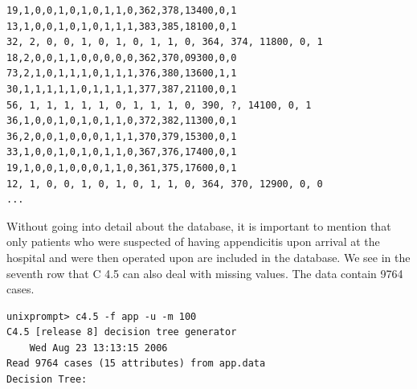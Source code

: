 \documentclass[10pt]{article}
\begin{document}
\begin{verbatim}
19,1,0,0,1,0,1,0,1,1,0,362,378,13400,0,1
13,1,0,0,1,0,1,0,1,1,1,383,385,18100,0,1
32, 2, 0, 0, 1, 0, 1, 0, 1, 1, 0, 364, 374, 11800, 0, 1
18,2,0,0,1,1,0,0,0,0,0,362,370,09300,0,0
73,2,1,0,1,1,1,0,1,1,1,376,380,13600,1,1
30,1,1,1,1,1,0,1,1,1,1,377,387,21100,0,1
56, 1, 1, 1, 1, 1, 0, 1, 1, 1, 0, 390, ?, 14100, 0, 1
36,1,0,0,1,0,1,0,1,1,0,372,382,11300,0,1
36,2,0,0,1,0,0,0,1,1,1,370,379,15300,0,1
33,1,0,0,1,0,1,0,1,1,0,367,376,17400,0,1
19,1,0,0,1,0,0,0,1,1,0,361,375,17600,0,1
12, 1, 0, 0, 1, 0, 1, 0, 1, 1, 0, 364, 370, 12900, 0, 0
...
\end{verbatim}

Without going into detail about the database, it is important to mention that only patients who were suspected of having appendicitis upon arrival at the hospital and were then operated upon are included in the database. We see in the seventh row that C 4.5 can also deal with missing values. The data contain 9764 cases.

\begin{verbatim}
unixprompt> c4.5 -f app -u -m 100
C4.5 [release 8] decision tree generator
    Wed Aug 23 13:13:15 2006
Read 9764 cases (15 attributes) from app.data
Decision Tree:
\end{verbatim}
\end{document}
